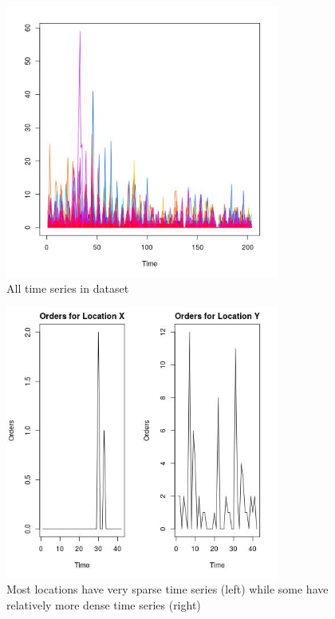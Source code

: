 \documentclass[12pt, letterpaper] {article}
\begin{document}
\begin{figure}[H]
    \centering
    \includegraphics[width=0.8\textwidth, height=0.5\textheight]{Images/example_all_ts.jpg}
    \caption{All time series in dataset}
    \label{fig:All time series in dataset}
\end{figure}


\begin{figure}[H]
    \centering
    \includegraphics[width=0.8\textwidth, height=0.3\textheight] {Images/example_ts.jpg}
    \caption{Most locations have very sparse time series (left) while some have relatively more dense time series (right)}
    \label{fig:Most locations have very sparse time series (left) while some have relatively more dense time series (right)}
\end{figure}
\end{document}
